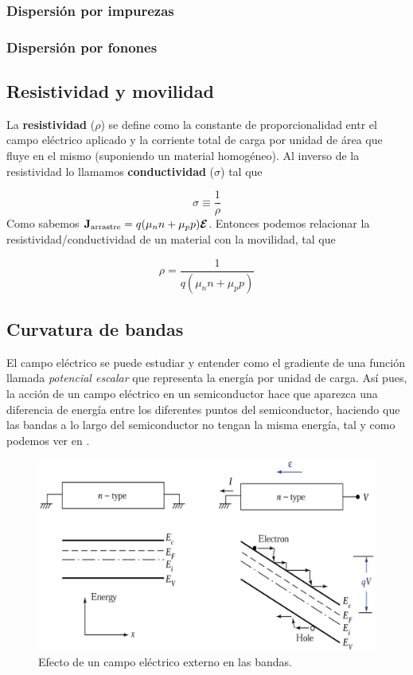 \subsubsection{Dispersión por impurezas}

\subsubsection{Dispersión por fonones}


\subsection{Resistividad y movilidad}

La \textbf{resistividad} ($\rho$) se define como la constante de proporcionalidad entr el campo eléctrico aplicado y la corriente total de carga por unidad de área que fluye en el mismo (suponiendo un material homogéneo). Al inverso de la resistividad lo llamamos \textbf{conductividad} ($\sigma$) tal que

\begin{equation}
	\sigma \equiv \frac{1}{\rho}
\end{equation}
Como sabemos $\mathbf{J}_{\text{arrastre}}=q(\mu_nn+\mu_pp)\boldsymbol{\mathcal{E}}$. Entonces podemos relacionar la resistividad/conductividad de un material con la movilidad, tal que

\begin{equation}
	\rho = \frac{1}{q(\mu_n n + \mu_p p)}
\end{equation}

\subsection{Curvatura de bandas}

El campo eléctrico se puede estudiar y entender como el gradiente de una función llamada \textit{potencial escalar} que representa la energía por unidad de carga. Así pues, la acción de un campo eléctrico en un semiconductor hace que aparezca una diferencia de energía entre los diferentes puntos del semiconductor, haciendo que las bandas a lo largo del semiconductor no tengan la misma energía, tal y como podemos ver en .

\begin{figure}[h!] \centering
	\includegraphics[width=0.8\linewidth]{Cuerpo/Ch_02/02_Campo_E.png}
	\caption{Efecto de un campo eléctrico externo en las bandas.}
	\label{Fig:02-03}
\end{figure}

